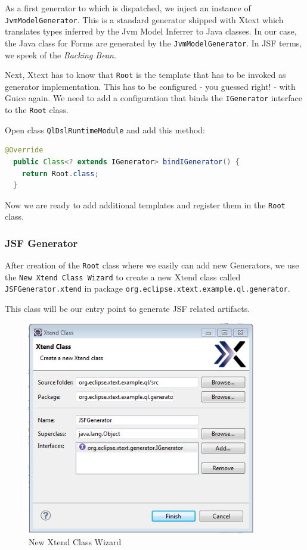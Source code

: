 As a first generator to which is dispatched, we inject an instance of
\texttt{JvmModelGenerator}. This is a standard generator shipped with Xtext which
translates types inferred by the Jvm Model Inferrer to Java classes.
In our case, the Java class for Forms are generated by the
\texttt{JvmModelGenerator}. In JSF terms, we speek of the \emph{Backing Bean}.
 
Next, Xtext has to know that \texttt{Root} is the template that has to be invoked
as generator implementation. This has to be configured - you guessed right! - 
with Guice again. We need to add a configuration that binds the \texttt{IGenerator}
interface to the \texttt{Root} class.

Open class \texttt{QlDslRuntimeModule} and add this method:

\begin{lstlisting}[language=Java]
  @Override
  public Class<? extends IGenerator> bindIGenerator() {
    return Root.class;
  }
\end{lstlisting}

Now we are ready to add additional templates and register them in the
\texttt{Root} class.

\subsubsection {JSF Generator}

After creation of the \texttt{Root} class where we easily can add new
Generators, we use the \texttt{New Xtend Class Wizard} to create a new Xtend
class called \texttt{JSFGenerator.xtend} in package
\texttt{org.eclipse.xtext.example.ql.generator}.

This class will be our entry point to generate JSF related artifacts.

\begin{figure}[here]
\centering
\includegraphics[width=10cm]{./images/chapter02/newXtendClassWizard.png}
\caption{New Xtend Class Wizard}
\label{fig:newXtendClassWizard}
\end{figure}

